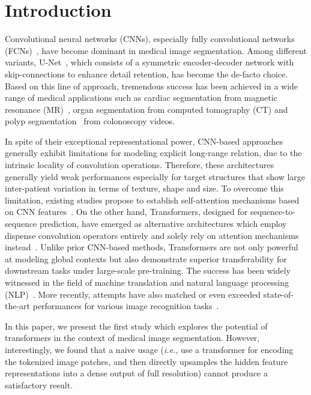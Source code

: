 \documentclass[runningheads]{llncs}
\begin{document}
\section{Introduction}
Convolutional neural networks (CNNs), especially fully convolutional networks (FCNs)~\cite{long2015fully}, have become dominant in medical image segmentation. Among different variants, U-Net~\cite{ronneberger2015u}, which consists of a symmetric encoder-decoder network with skip-connections to enhance detail retention, has become the de-facto choice.
Based on this line of approach, tremendous success has been achieved in a wide range of medical applications such as cardiac segmentation from magnetic resonance (MR)~\cite{yu2017automatic}, organ segmentation from computed tomography (CT) \cite{zhou2017fixed,li2018h,yu2018recurrent} and polyp segmentation~\cite{zhou2018unet++} from colonoscopy videos.

In spite of their exceptional representational power,  CNN-based approaches generally exhibit limitations for modeling explicit long-range relation, due to the intrinsic locality of convolution operations.
Therefore, these architectures generally yield weak performances especially for target structures that show large inter-patient variation in terms of texture, shape and size.
To overcome this limitation, existing studies propose to establish self-attention mechanisms based on CNN features~\cite{wang2018non,schlemper2019attention}.
On the other hand, Transformers, designed for sequence-to-sequence prediction, have emerged as alternative architectures which employ dispense convolution operators entirely and solely rely on attention mechanisms instead~\cite{vaswani2017attention}. 
Unlike prior CNN-based methods, Transformers are not only powerful at modeling global contexts but also demonstrate superior transferability for downstream tasks under large-scale pre-training.
The success has been widely witnessed in the field of machine translation and natural language processing (NLP)~\cite{vaswani2017attention,devlin2018bert}.
More recently, attempts have also matched or even exceeded state-of-the-art performances for various image recognition tasks~\cite{dosovitskiy2020image,zheng2020rethinking}. 

In this paper, we present the first study which explores the potential of transformers in the context of medical image segmentation. 
However, interestingly, we found that a naive usage ({\em i.e.}, use a transformer for encoding the tokenized image patches, and then directly upsamples the hidden feature representations into a dense output of full resolution) cannot produce a satisfactory result.
 
\end{document}
